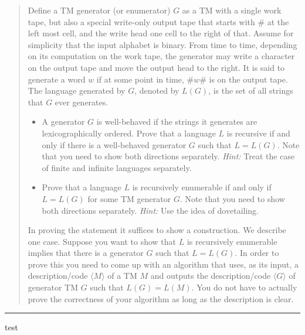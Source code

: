 \documentclass[11pt]{article}
\begin{document}
\begin{quote}
Define a TM generator (or enumerator) $G$ as a TM with a single
  work tape, but also a special write-only output tape that starts
  with $\#$ at the left most cell, and the write head one cell to the
  right of that.  Assume for simplicity that the input alphabet is
  binary.  From time to time, depending on its computation on the work
  tape, the generator may write a character on the output tape and
  move the output head to the right.  It is said to generate a word
  $w$ if at some point in time, $\#w\#$ is on the output tape. The
  language generated by $G$, denoted by $L(G)$, is the set of all
  strings that $G$ ever generates.
  \begin{itemize}
  \item A generator $G$ is well-behaved if the strings it generates
    are lexicographically ordered. Prove that a language $L$ is
    recursive if and only if there is a well-behaved generator $G$ such
    that $L=L(G)$. Note that you need
    to show both directions separately. {\em Hint:} Treat the case of finite and
    infinite languages separately.

  \item Prove that a language $L$ is recursively enumerable if and
    only if $L = L(G)$ for some TM generator $G$. Note that you need
    to show both directions separately. {\em Hint:} Use the idea of
    dovetailing.
  \end{itemize}
  In proving the statement it suffices to show a construction. We
  describe one case. Suppose you want to show that $L$ is recursively
  enumerable implies that there is a generator $G$ such that
  $L = L(G)$. In order to prove this you need to come up with an
  algorithm that uses, as its input, a description/code
  $\langle M \rangle$ of a TM $M$ and outputs the description/code
  $\langle G \rangle$ of generator TM $G$ such that $L(G) = L(M)$.  You
  do not have to actually prove the correctness of your algorithm as long as
  the description is clear.
\end{quote}
\hrule



\begin{solution}
test
\end{solution}
\end{document}
